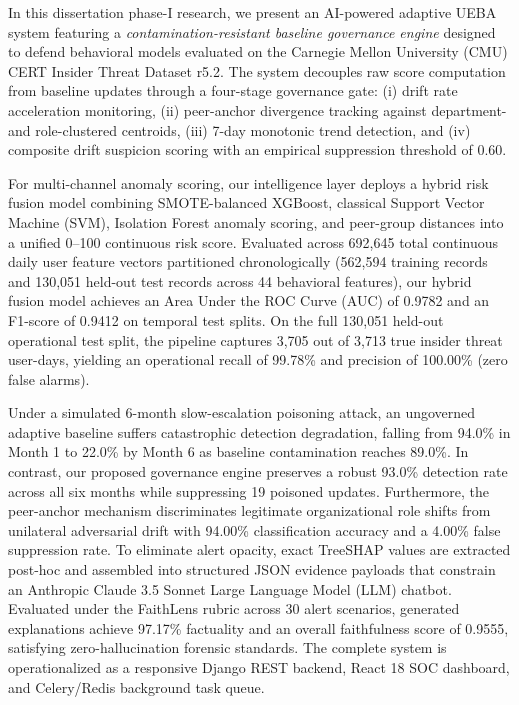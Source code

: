 \documentclass[12pt,a4paper]{report}
\begin{document}
In this dissertation phase-I research, we present an AI-powered adaptive UEBA system featuring a \textit{contamination-resistant baseline governance engine} designed to defend behavioral models evaluated on the Carnegie Mellon University (CMU) CERT Insider Threat Dataset r5.2. The system decouples raw score computation from baseline updates through a four-stage governance gate: (i) drift rate acceleration monitoring, (ii) peer-anchor divergence tracking against department- and role-clustered centroids, (iii) 7-day monotonic trend detection, and (iv) composite drift suspicion scoring with an empirical suppression threshold of 0.60.

For multi-channel anomaly scoring, our intelligence layer deploys a hybrid risk fusion model combining SMOTE-balanced XGBoost, classical Support Vector Machine (SVM), Isolation Forest anomaly scoring, and peer-group distances into a unified 0--100 continuous risk score. Evaluated across 692,645 total continuous daily user feature vectors partitioned chronologically (562,594 training records and 130,051 held-out test records across 44 behavioral features), our hybrid fusion model achieves an Area Under the ROC Curve (AUC) of 0.9782 and an F1-score of 0.9412 on temporal test splits. On the full 130,051 held-out operational test split, the pipeline captures 3,705 out of 3,713 true insider threat user-days, yielding an operational recall of 99.78\% and precision of 100.00\% (zero false alarms).

Under a simulated 6-month slow-escalation poisoning attack, an ungoverned adaptive baseline suffers catastrophic detection degradation, falling from 94.0\% in Month 1 to 22.0\% by Month 6 as baseline contamination reaches 89.0\%. In contrast, our proposed governance engine preserves a robust 93.0\% detection rate across all six months while suppressing 19 poisoned updates. Furthermore, the peer-anchor mechanism discriminates legitimate organizational role shifts from unilateral adversarial drift with 94.00\% classification accuracy and a 4.00\% false suppression rate. To eliminate alert opacity, exact TreeSHAP values are extracted post-hoc and assembled into structured JSON evidence payloads that constrain an Anthropic Claude 3.5 Sonnet Large Language Model (LLM) chatbot. Evaluated under the FaithLens rubric across 30 alert scenarios, generated explanations achieve 97.17\% factuality and an overall faithfulness score of 0.9555, satisfying zero-hallucination forensic standards. The complete system is operationalized as a responsive Django REST backend, React 18 SOC dashboard, and Celery/Redis background task queue.
\end{document}
